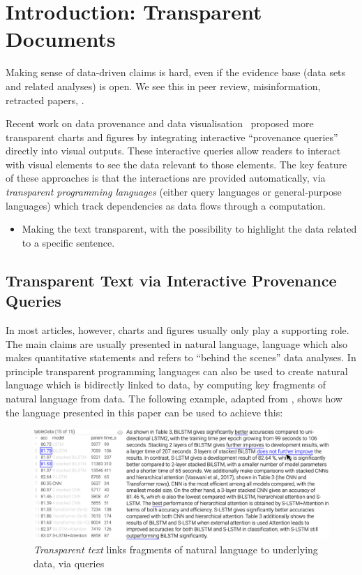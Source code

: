 \section{Introduction: Transparent Documents}

Making sense of data-driven claims is hard, even if the evidence base (data sets and related analyses) is
open. We see this in peer review, misinformation, retracted papers, .

Recent work on data provenance and data visualisation~\citep{psallidas18smoke,perera22,bond25} proposed more
transparent charts and figures by integrating interactive ``provenance queries'' directly into visual outputs.
These interactive queries allow readers to interact with visual elements to see the data relevant to those
elements. The key feature of these approaches is that the interactions are provided automatically, via
\emph{transparent programming languages} (either query languages or general-purpose languages) which track
dependencies as data flows through a computation.

\begin{itemize}
    \item Making the text transparent, with the possibility to highlight the data related to a specific sentence.
\end{itemize}

\subsection{Transparent Text via Interactive Provenance Queries}

In most articles, however, charts and figures usually only play a supporting role. The main claims are usually
presented in natural language, language which also makes quantitative statements and refers to ``behind the
scenes'' data analyses. In principle transparent programming languages can also be used to create natural
language which is bidirectly linked to data, by computing key fragments of natural language from data. The
following example, adapted from \cite{moosavi21}, shows how the language presented in this paper can be used
to achieve this:

\begin{figure}[h]
    \centering
    \includegraphics[width=\linewidth]{fig/scigen-1805.02474v1-10-with-pointer.png}
    \caption{\emph{Transparent text} links fragments of natural language to underlying data, via queries}\label{fig:scigen-example-website}
\end{figure}

